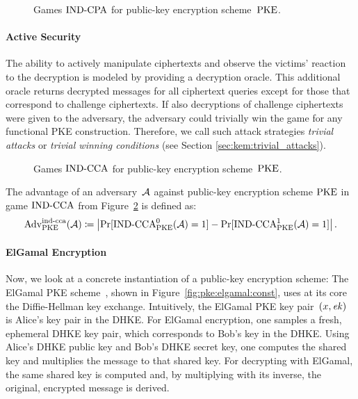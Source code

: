 \begin{figure}[!ht]
    \centering
    \nicoresetlinenr%
    \fbox{%
        \scalebox{\codescalefactor}{%
        }%
    }
    \caption{%
        Games ${\mathrm{IND}\text{-}\mathrm{CPA}}$ for public-key encryption scheme~$\mathrm{PKE}$.
    }
    \label{fig:pke:ind:cpa}
\end{figure}

\paragraph{Active Security}
The ability to actively manipulate ciphertexts and observe the victims' reaction to the decryption is modeled by providing a decryption oracle.
This additional oracle returns decrypted messages for all ciphertext queries except for those that correspond to challenge ciphertexts.
If also decryptions of challenge ciphertexts were given to the adversary, the adversary could trivially win the game for any functional PKE construction.
Therefore, we call such attack strategies \emph{trivial attacks} or \emph{trivial winning conditions} (see Section \ref{sec:kem:trivial_attacks}).

\begin{figure}[!ht]
    \centering
    \nicoresetlinenr%
    \fbox{%
        \scalebox{\codescalefactor}{%
        }%
    }
    \caption{%
        Games ${\mathrm{IND}\text{-}\mathrm{CCA}}$ for public-key encryption scheme~$\mathrm{PKE}$.
    }
    \label{fig:pke:ind}
\end{figure}

The advantage of an adversary~$\mathcal{A}$ against public-key encryption scheme $\mathrm{PKE}$ in game ${\mathrm{IND}\text{-}\mathrm{CCA}}$ from Figure~\ref{fig:pke:ind} is defined as:
\[
\mathrm{Adv}_{\mathrm{PKE}}^{\mathrm{ind}\text{-}\mathrm{cca}}(\mathcal{A})\coloneqq\left|\Pr[{\mathrm{IND}\text{-}\mathrm{CCA}}_{\mathrm{PKE}}^0(\mathcal{A})=1]-\Pr[{\mathrm{IND}\text{-}\mathrm{CCA}}_{\mathrm{PKE}}^1(\mathcal{A})=1]\right|\text{.}
\]

\paragraph{ElGamal Encryption}
Now, we look at a concrete instantiation of a public-key encryption scheme:
The ElGamal PKE scheme~\cite{ElGamal85}, shown in Figure~\ref{fig:pke:elgamal:const}, uses at its core the Diffie-Hellman key exchange.
Intuitively, the ElGamal PKE key pair~$(x,\mathit{ek})$ is Alice's key pair in the DHKE.
For ElGamal encryption, one samples a fresh, ephemeral DHKE key pair, which corresponds to Bob's key in the DHKE.
Using Alice's DHKE public key and Bob's DHKE secret key, one computes the shared key and multiplies the message to that shared key.
For decrypting with ElGamal, the same shared key is computed and, by multiplying with its inverse, the original, encrypted message is derived.

